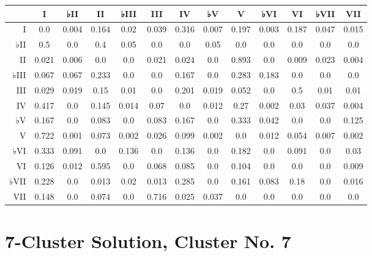\begin{table}[htbp]
\begin{minipage}{\linewidth}
\setlength{\tymax}{0.5\linewidth}
\centering
\small
\begin{tabulary}{\textwidth}{@{}RCCCCCCCCCCCC@{}} \toprule
&I&♭II&II&♭III&III&IV&♭V&V&♭VI&VI&♭VII&VII\\
\midrule
I&0.0&0.004&0.164&0.02&0.039&0.316&0.007&0.197&0.003&0.187&0.047&0.015\\
♭II&0.5&0.0&0.4&0.05&0.0&0.0&0.05&0.0&0.0&0.0&0.0&0.0\\
II&0.021&0.006&0.0&0.0&0.021&0.024&0.0&0.893&0.0&0.009&0.023&0.004\\
♭III&0.067&0.067&0.233&0.0&0.0&0.167&0.0&0.283&0.183&0.0&0.0&0.0\\
III&0.029&0.019&0.15&0.01&0.0&0.201&0.019&0.052&0.0&0.5&0.01&0.01\\
IV&0.417&0.0&0.145&0.014&0.07&0.0&0.012&0.27&0.002&0.03&0.037&0.004\\
♭V&0.167&0.0&0.083&0.0&0.083&0.167&0.0&0.333&0.042&0.0&0.0&0.125\\
V&0.722&0.001&0.073&0.002&0.026&0.099&0.002&0.0&0.012&0.054&0.007&0.002\\
♭VI&0.333&0.091&0.0&0.136&0.0&0.136&0.0&0.182&0.0&0.091&0.0&0.03\\
VI&0.126&0.012&0.595&0.0&0.068&0.085&0.0&0.104&0.0&0.0&0.0&0.009\\
♭VII&0.228&0.0&0.013&0.02&0.013&0.285&0.0&0.161&0.083&0.18&0.0&0.016\\
VII&0.148&0.0&0.074&0.0&0.716&0.025&0.037&0.0&0.0&0.0&0.0&0.0\\

\bottomrule

\end{tabulary}
\end{minipage}
\end{table}

\section{7-Cluster Solution, Cluster No. 7}
\label{7-clustersolutionclusterno.7}

